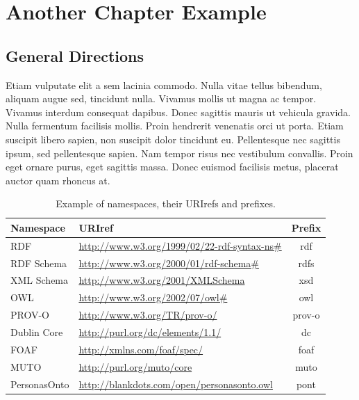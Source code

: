 
\chapter{Another Chapter Example}
\label{chap:Chapter}
\PartialToc %


\section{General Directions}

Etiam vulputate elit\cite{Weiser1991} a sem lacinia commodo. Nulla vitae tellus bibendum, aliquam augue sed, tincidunt nulla. Vivamus mollis ut magna ac tempor. Vivamus interdum consequat dapibus. Donec sagittis mauris ut vehicula gravida. Nulla fermentum facilisis mollis. Proin hendrerit venenatis orci ut porta. Etiam suscipit libero sapien, non suscipit dolor tincidunt eu. Pellentesque nec sagittis ipsum, sed pellentesque sapien. Nam tempor risus nec vestibulum convallis. Proin eget ornare purus, eget sagittis massa. Donec euismod facilisis metus, placerat auctor quam rhoncus at.


\begin{table}
\small
\renewcommand{\arraystretch}{1.3}
\centering
\caption{Example of namespaces, their URIrefs and prefixes.}
\begin{tabular}{|l|l|c|} \hline
    Namespace & URIref & Prefix \\ \hline
    \hline
	RDF & \url{http://www.w3.org/1999/02/22-rdf-syntax-ns#} & rdf \\ \hline
	RDF Schema & \url{http://www.w3.org/2000/01/rdf-schema#} & rdfs \\ \hline
	XML Schema & \url{http://www.w3.org/2001/XMLSchema} & xsd \\ \hline
	OWL & \url{http://www.w3.org/2002/07/owl#} & owl \\ \hline
	PROV-O & \url{http://www.w3.org/TR/prov-o/} & prov-o \\ \hline
	Dublin Core & \url{http://purl.org/dc/elements/1.1/} & dc \\ \hline
	FOAF & \url{http://xmlns.com/foaf/spec/} & foaf \\ \hline
	MUTO & \url{http://purl.org/muto/core} & muto \\ \hline
	PersonasOnto & \url{http://blankdots.com/open/personasonto.owl} & pont \\
	\hline
\end{tabular}
\label{tab:Namespaces}
\end{table}

